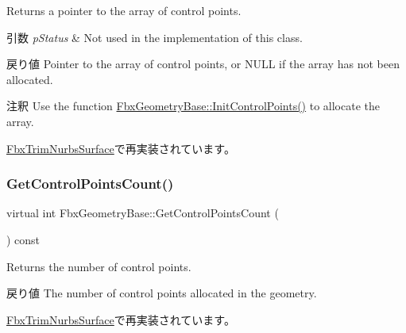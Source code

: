 Returns a pointer to the array of control points. 
\begin{DoxyParams}{引数}
{\em p\+Status} & Not used in the implementation of this class. \\
\hline
\end{DoxyParams}
\begin{DoxyReturn}{戻り値}
Pointer to the array of control points, or {\ttfamily N\+U\+LL} if the array has not been allocated. 
\end{DoxyReturn}
\begin{DoxyRemark}{注釈}
Use the function \hyperlink{class_fbx_geometry_base_a471b736f2595c006a338c07a61907127}{Fbx\+Geometry\+Base\+::\+Init\+Control\+Points()} to allocate the array. 
\end{DoxyRemark}


\hyperlink{class_fbx_trim_nurbs_surface_aff21dc007688399ca91da1a9c9f6e584}{Fbx\+Trim\+Nurbs\+Surface}で再実装されています。

\mbox{\label{class_fbx_geometry_base_aa9f42ae6a958036722670143fabf3b17}} 
\subsubsection{\texorpdfstring{Get\+Control\+Points\+Count()}{GetControlPointsCount()}}
{\footnotesize\ttfamily virtual int Fbx\+Geometry\+Base\+::\+Get\+Control\+Points\+Count (\begin{DoxyParamCaption}{ }\end{DoxyParamCaption}) const\hspace{0.3cm}{\ttfamily [virtual]}}

Returns the number of control points. \begin{DoxyReturn}{戻り値}
The number of control points allocated in the geometry. 
\end{DoxyReturn}


\hyperlink{class_fbx_trim_nurbs_surface_a11c7260f31786dd8ace17769d0ccb302}{Fbx\+Trim\+Nurbs\+Surface}で再実装されています。

\mbox{\label{class_fbx_geometry_base_a810b4a313e01bbaa41fe25ac753a8996}} 
